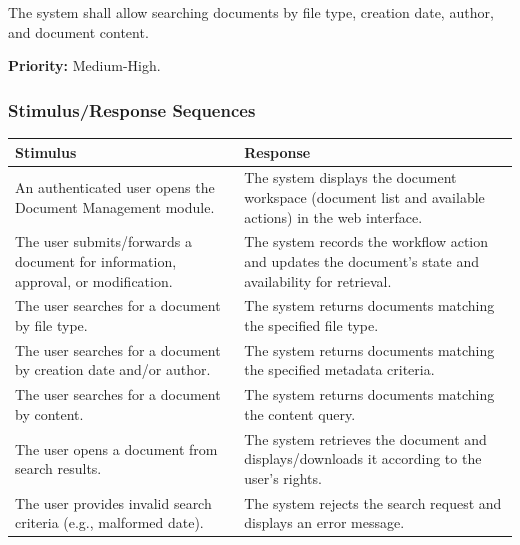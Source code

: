 \documentclass[11pt, a4paper]{article}
\begin{document}
The system shall allow searching documents by file type, creation date, author, and document content.

\textbf{Priority:} Medium-High.

\subsubsection{Stimulus/Response Sequences}
\begin{table}[H]
\begin{tabularx}{\textwidth}{>{\raggedright\arraybackslash}p{3.2cm} >{\raggedright\arraybackslash}X}
\toprule
\textbf{Stimulus} & \textbf{Response} \\
\midrule
An authenticated user opens the Document Management module. & The system displays the document workspace (document list and available actions) in the web interface. \\
\midrule
The user submits/forwards a document for information, approval, or modification. & The system records the workflow action and updates the document's state and availability for retrieval. \\
\midrule
The user searches for a document by file type. & The system returns documents matching the specified file type. \\
\midrule
The user searches for a document by creation date and/or author. & The system returns documents matching the specified metadata criteria. \\
\midrule
The user searches for a document by content. & The system returns documents matching the content query. \\
\midrule
The user opens a document from search results. & The system retrieves the document and displays/downloads it according to the user's rights. \\
\midrule
The user provides invalid search criteria (e.g., malformed date). & The system rejects the search request and displays an error message. \\
\bottomrule
\end{tabularx}
\end{table}
\end{document}
